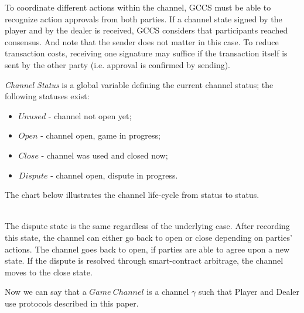 To coordinate different actions within the channel, GCCS must be able to recognize action approvals from both parties. If a channel state signed by the player and by the dealer is received, GCCS considers that participants reached consensus. And note that the sender does not matter in this case. To reduce transaction costs, receiving one signature may suffice if the transaction itself is sent by the other party (i.e. approval is confirmed by sending).  

\textit {Channel Status} is a global variable defining the current channel status; the following statuses exist:
\begin{itemize}
	\item $Unused$ - channel not open yet;
	\item $Open$ - channel open, game in progress;
	\item $Close$ - channel was used and closed now;
	\item $Dispute$ - channel open, dispute in progress.
\end{itemize}

The chart below illustrates the channel life-cycle from status to status.
\\
\\
\begin{center}
\end{center}

The dispute state is the same regardless of the underlying case. After recording this state, the channel can either go back to open or close depending on parties' actions. The channel goes back to open, if parties are able to agree upon a new state. If the dispute is resolved through smart-contract arbitrage, the channel moves to the close state.

Now we can say that a $ Game \ Channel $ is a channel $\gamma$ such that Player and Dealer use protocols described in this paper. 

